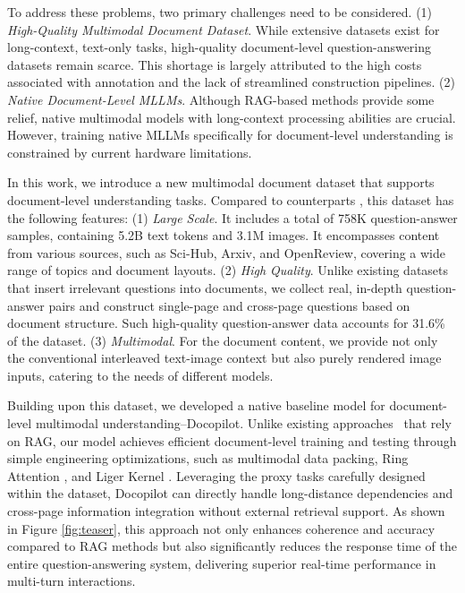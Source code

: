 \documentclass[10pt,twocolumn,letterpaper]{article}
\def\modelname{Docopilot\xspace}
\begin{document}
\begin{CJK}{UTF8}{gbsn}
To address these problems, two primary challenges need to be considered.
(1) \emph{High-Quality Multimodal Document Dataset}. While extensive datasets \cite{chen2023longlora, yang2023longqlora, zhang2024longreward, zhang2024longcite} exist for long-context, text-only tasks, high-quality document-level question-answering datasets remain scarce. This shortage is largely attributed to the high costs associated with annotation and the lack of streamlined construction pipelines.
(2) \emph{Native Document-Level MLLMs}. Although RAG-based methods \cite{yu2024visrag, cho2024m3docrag, wang2024mmniah} provide some relief, native multimodal models with long-context processing abilities are crucial. However, training native MLLMs specifically for document-level understanding is constrained by current hardware limitations.

In this work, we introduce a new multimodal document dataset that supports document-level understanding tasks. Compared to counterparts \cite{van2023document, laurenccon2024docmatix, tito2023mpdocvqa}, this dataset has the following features:
(1) \emph{Large Scale}. It includes a total of 758K question-answer samples, containing 5.2B text tokens and 3.1M images. It encompasses content from various sources, such as Sci-Hub, Arxiv, and OpenReview, covering a wide range of topics and document layouts.
(2) \emph{High Quality}. Unlike existing datasets that insert irrelevant questions into documents, we collect real, in-depth question-answer pairs and construct single-page and cross-page questions based on document structure. Such high-quality question-answer data accounts for 31.6\% of the dataset. 
(3) \emph{Multimodal}. For the document content, we provide not only the conventional interleaved text-image context but also purely rendered image inputs, catering to the needs of different models.


Building upon this dataset, we developed a native baseline model for document-level multimodal understanding--\modelname.
Unlike existing approaches~\cite{yu2024visrag, cho2024m3docrag, wang2024mmniah} that rely on RAG, our model achieves efficient document-level training and testing through simple engineering optimizations, such as multimodal data packing, Ring Attention \cite{liu2023ring}, and Liger Kernel \cite{dai2024ligerkernel}.
Leveraging the proxy tasks carefully designed within the dataset, \modelname can directly handle long-distance dependencies and cross-page information integration without external retrieval support.
As shown in Figure \ref{fig:teaser}, this approach not only enhances coherence and accuracy compared to RAG methods but also significantly reduces the response time of the entire question-answering system, delivering superior real-time performance in multi-turn interactions.


\end{CJK}
\end{document}
